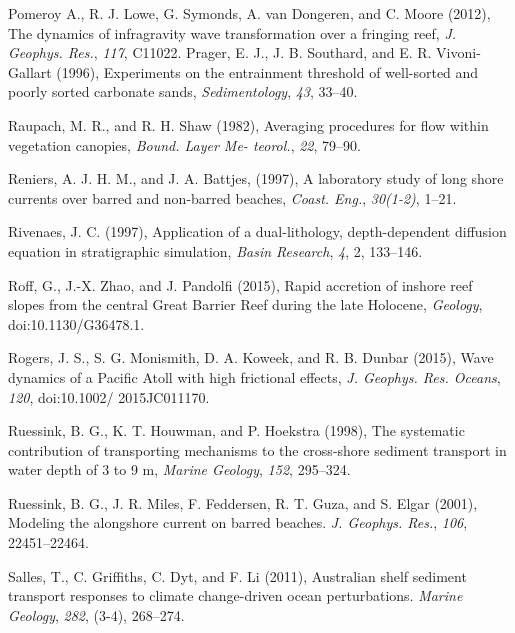 \documentclass[default,jgrga]{agutex2015}
\begin{document}
\begin{article}
\begin{thebibliography}{}
Pomeroy A., R. J. Lowe, G. Symonds, A. van Dongeren,  and C. Moore (2012), The dynamics of infragravity wave transformation over a fringing reef, \textit{J. Geophys. Res.}, \textit{117}, C11022.
Prager, E. J., J. B. Southard, and E. R. Vivoni-Gallart (1996), Experiments on the entrainment threshold of well-sorted and poorly sorted carbonate sands, \textit{Sedimentology}, \textit{43}, 33--40.

Raupach, M. R., and R. H. Shaw (1982), Averaging procedures for flow within vegetation canopies, \textit{Bound. Layer Me-
teorol.}, \textit{22}, 79--90.

Reniers, A. J. H. M., and J. A. Battjes, (1997), A laboratory study of long shore currents over barred and non-barred beaches,  \textit{Coast. Eng.}, \textit{30(1-2)}, 1--21.

Rivenaes, J. C. (1997), Application of a dual-lithology, depth-dependent diffusion equation in stratigraphic simulation, \textit{Basin Research}, \textit{4}, 2, 133--146.

Roff, G., J.-X. Zhao, and J. Pandolfi (2015), Rapid accretion of inshore reef slopes from the central Great Barrier Reef during the late Holocene, \textit{Geology}, doi:10.1130/G36478.1.

Rogers, J. S., S. G. Monismith, D. A. Koweek, and R. B. Dunbar (2015), Wave dynamics of a Pacific Atoll with high frictional effects, \textit{J. Geophys. Res. Oceans}, \textit{120}, doi:10.1002/ 2015JC011170.

Ruessink, B. G., K. T. Houwman, and P. Hoekstra (1998), The systematic contribution of transporting mechanisms to the cross-shore sediment transport in water depth of 3 to 9 m, \textit{Marine Geology}, \textit{152}, 295--324.

Ruessink, B. G., J. R. Miles, F. Feddersen, R. T. Guza, and S. Elgar (2001), Modeling the alongshore current on barred beaches.  \textit{J. Geophys. Res.}, \textit{106}, 22451--22464.

Salles, T., C. Griffiths, C. Dyt, and F. Li (2011), Australian shelf sediment transport responses to climate change-driven ocean perturbations. \textit{Marine Geology}, \textit{282}, (3-4), 268--274.


\end{thebibliography}
\end{article}
\end{document}
